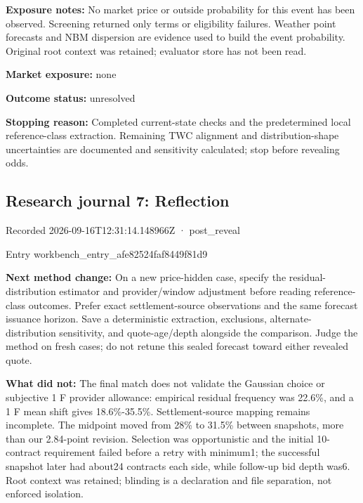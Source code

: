 \documentclass[11pt]{article}
\begin{document}
\par\noindent\textbf{Exposure notes:} No market price or outside probability for this event has been observed. Screening returned only terms or eligibility failures. Weather point forecasts and NBM dispersion are evidence used to build the event probability. Original root context was retained; evaluator store has not been read.

\par\noindent\textbf{Market exposure:} none

\par\noindent\textbf{Outcome status:} unresolved

\par\noindent\textbf{Stopping reason:} Completed current-state checks and the predetermined local reference-class extraction. Remaining TWC alignment and distribution-shape uncertainties are documented and sensitivity calculated; stop before revealing odds.

\subsection*{\textcolor{epdarkgreen}{Research journal 7: Reflection}}
Recorded 2026-09-16T12:31:14.148966Z · post\_reveal


Entry workbench\_en\hspace{0pt}try\_afe82524\hspace{0pt}faf8449f81d9


\par\noindent\textbf{Next method change:} On a new price-hidden case, specify the residual-distribution estimator and provider/window adjustment before reading reference-class outcomes. Prefer exact settlement-source observations and the same forecast issuance horizon. Save a deterministic extraction, exclusions, alternate-distribution sensitivity, and quote-age/depth alongside the comparison. Judge the method on fresh cases; do not retune this sealed forecast toward either revealed quote.

\par\noindent\textbf{What did not:} The final match does not validate the Gaussian choice or subjective 1 F provider allowance: empirical residual frequency was 22.6\%, and a 1 F mean shift gives 18.6\%-35.5\%. Settlement-source mapping remains incomplete. The midpoint moved from 28\% to 31.5\% between snapshots, more than our 2.84-point revision. Selection was opportunistic and the initial 10-contract requirement failed before a retry with minimum1; the successful snapshot later had about24 contracts each side, while follow-up bid depth was6. Root context was retained; blinding is a declaration and file separation, not enforced isolation.
\end{document}
